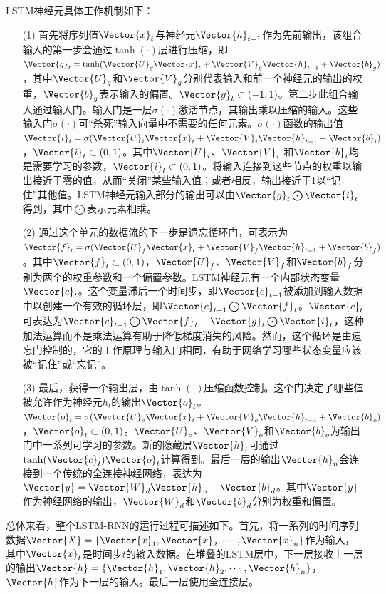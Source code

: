 LSTM神经元具体工作机制如下：
\begin{enumerate}
  \item[(1)] 首先将序列值$\Vector{x}_t$与神经元$\Vector{h}_{t-1}$作为先前输出，该组合输入的第一步会通过$\tanh(\cdot)$层进行压缩，即$\Vector{g}_t=\tanh(\Vector{U}_g \Vector{x}_t+\Vector{V}_g\Vector{h}_{t-1}+\Vector{b}_g)$，其中$\Vector{U}_g$和$\Vector{V}_g$分别代表输入和前一个神经元的输出的权重，$\Vector{b}_g$表示输入的偏置。$\Vector{g}_t\subset(-1,1)$。第二步此组合输入通过输入门。输入门是一层$\sigma(\cdot)$激活节点，其输出乘以压缩的输入。这些输入门$\sigma(\cdot)$可“杀死”输入向量中不需要的任何元素。$\sigma(\cdot)$函数的输出值$\Vector{i}_t=\sigma(\Vector{U}_i \Vector{x}_t+\Vector{V}_i\Vector{h}_{t-1}+\Vector{b}_i)$，$\Vector{i}_t\subset(0,1)$。其中$\Vector{U}_i$、$\Vector{V}_i$ 和$\Vector{b}_i$均是需要学习的参数，$\Vector{i}_t\subset(0,1)$。将输入连接到这些节点的权重以输出接近于零的值，从而“关闭”某些输入值；或者相反，输出接近于1以“记住”其他值。LSTM神经元输入部分的输出可以由$\Vector{g}_t\bigodot\Vector{i}_t$得到，其中$\bigodot$表示元素相乘。
  \item[(2)] 通过这个单元的数据流的下一步是遗忘循环门，可表示为$\Vector{f}_t=\sigma(\Vector{U}_f\Vector{x}_t+\Vector{V}_f\Vector{h}_{t-1}+\Vector{b}_f)$。其中$\Vector{f}_t\subset(0,1)$，$\Vector{U}_f$、$\Vector{V}_f$和$\Vector{b}_f$分别为两个的权重参数和一个偏置参数。LSTM神经元有一个内部状态变量$\Vector{c}_t$。这个变量滞后一个时间步，即$\Vector{c}_{t-1}$被添加到输入数据中以创建一个有效的循环层，即$\Vector{c}_{t-1}\bigodot\Vector{f}_t$。$\Vector{c}_t$可表达为$\Vector{c}_{t-1}\bigodot\Vector{f}_t+\Vector{g}_t\bigodot\Vector{i}_t$，这种加法运算而不是乘法运算有助于降低梯度消失的风险。然而，这个循环是由遗忘门控制的，它的工作原理与输入门相同，有助于网络学习哪些状态变量应该被“记住”或“忘记”。
  \item[(3)] 最后，获得一个输出层，由$\tanh(\cdot)$压缩函数控制。这个门决定了哪些值被允许作为神经元$h_t$的输出$\Vector{o}_t$。$\Vector{o}_t=\sigma(\Vector{U}_o\Vector{x}_t+\Vector{V}_o\Vector{h}_{t-1}+\Vector{b}_o)$，$\Vector{o}_t\subset(0,1)$。$\Vector{U}_o$、$\Vector{V}_o$和$\Vector{b}_o$为输出门中一系列可学习的参数。新的隐藏层$\Vector{h}_t$可通过$\tanh(\Vector{c}_t)\Vector{o}_t$计算得到。最后一层的输出$\Vector{h}_n$会连接到一个传统的全连接神经网络，表达为$\Vector{y}=\Vector{W}_d\Vector{h}_n+\Vector{b}_d$。其中$\Vector{y}$作为神经网络的输出，$\Vector{W}_d$和$\Vector{b}_d$分别为权重和偏置。
\end{enumerate}

总体来看，整个LSTM-RNN的运行过程可描述如下。首先，将一系列的时间序列数据$\Vector{X}=\{\Vector{x}_1,\Vector{x}_2,\cdots,\Vector{x}_n\}$作为输入，其中$\Vector{x}_t$是时间步$t$的输入数据。在堆叠的LSTM层中，下一层接收上一层的输出$\Vector{h}=\{\Vector{h}_1,\Vector{h}_2,\cdots,\Vector{h}_n\}$，$\Vector{h}$作为下一层的输入。最后一层使用全连接层。


